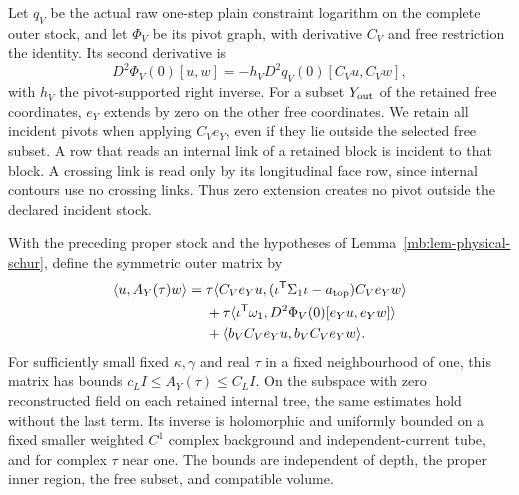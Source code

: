 \documentclass[11pt,letterpaper,reqno]{amsart}
\makeatletter
\numberwithin{equation}{section}
\theoremstyle{definition}
\newcommand{\ms@majorstart}{%
  \pushQED{\qed}\renewcommand{\qedsymbol}{$\blacksquare\square$}}
\newenvironment{theorem}[1][]{\ms@majorstart\ms@theorem[#1]}
  {\popQED\endms@theorem}
\theoremstyle{remark}
\makeatother
\begin{document}
Let \(q_V\) be the actual raw one-step plain constraint
logarithm on the complete outer stock, and let \(\Phi_V\)
be its pivot graph, with derivative \(C_V\) and free
restriction the identity. Its second derivative is
\[
 D^2\Phi_V(0)[u,w]
       =-h_VD^2q_V(0)[C_Vu,C_Vw],
\]
with \(h_V\) the pivot-supported right inverse. For a subset
\(Y_{\rm out}\) of the retained free coordinates, \(e_Y\)
extends by zero on the other free coordinates. We retain
all incident pivots when applying \(C_Ve_Y\), even if
they lie outside the selected free subset. A row that
reads an internal link of a retained block is incident
to that block. A crossing link is read only by its
longitudinal face row, since internal contours use no
crossing links. Thus zero extension creates no pivot
outside the declared incident stock.

\begin{theorem}[The proper outer fluctuation gap]
\label{mb:thm-physical-outer-gap}
With the preceding proper stock and the hypotheses of
Lemma~\ref{mb:lem-physical-schur}, define the symmetric
outer matrix by
\begin{equation}\label{mb:eq-physical-outer-form}
 \begin{split}
 \langle u,A_Y(\tau)w\rangle
 ={}&\tau\langle C_Ve_Yu,
       (\iota^{\mathsf T}\Sigma_1\iota-a_{\rm top})C_Ve_Yw\rangle\\
 &+\tau\langle\iota^{\mathsf T}\omega_1,
                              D^2\Phi_V(0)[e_Yu,e_Yw]\rangle\\
 &+\langle b_VC_Ve_Yu,b_VC_Ve_Yw\rangle .
 \end{split}
\end{equation}
For sufficiently small fixed \(\kappa,\gamma\) and real
\(\tau\) in a fixed neighbourhood of one, this matrix
has bounds \(c_LI\le A_Y(\tau)\le C_LI\).
On the subspace with zero reconstructed field on each
retained internal tree, the same estimates hold without
the last term. Its inverse is holomorphic and uniformly
bounded on a fixed smaller weighted \(C^1\) complex
background and independent-current tube, and for complex
\(\tau\) near one. The bounds are independent of depth,
the proper inner region, the free subset, and compatible
volume.
\end{theorem}
\end{document}
